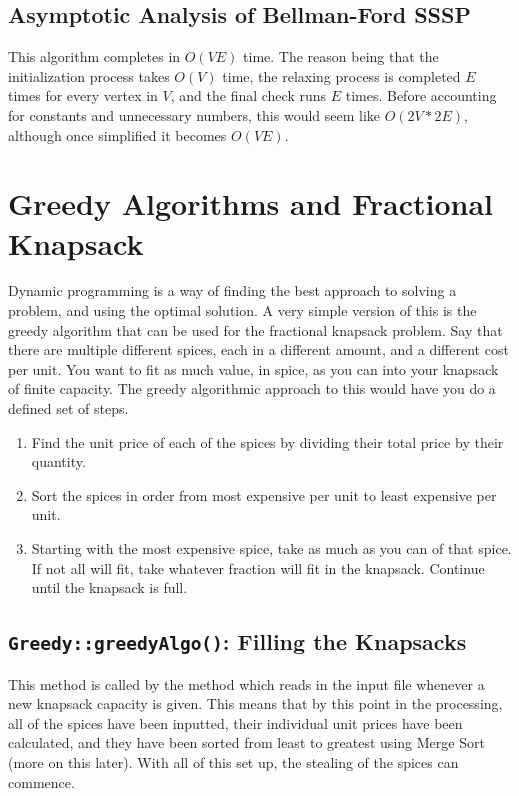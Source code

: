 \documentclass[letterpaper, 10pt]{article}
\begin{document}
\subsection{Asymptotic Analysis of Bellman-Ford SSSP}

This algorithm completes in $O(VE)$ time. The reason being that the initialization process takes $O(V)$ time,  the relaxing process is completed $E$ times for every  vertex in $V$, and the final check runs $E$ times. Before accounting for constants and unnecessary numbers, this would seem like $O(2V*2E)$, although once simplified it becomes $O(VE)$.

\section{Greedy Algorithms and Fractional Knapsack}

Dynamic programming is a way of finding the best approach to solving a problem, and using the optimal solution. A very simple version of this is the greedy algorithm that can be used for the fractional knapsack problem. Say that there are multiple different spices, each in a different amount, and a different cost per unit. You want to fit as much value, in spice, as you can into your knapsack of finite capacity. The greedy algorithmic approach to this would have you do a defined set of steps.

\begin{enumerate}
    \item Find the unit price of each of the spices by dividing their total price by their quantity.
    \item Sort the spices in order from most expensive per unit to least expensive per unit.
    \item Starting with the most expensive spice, take as much as you can of that spice. If not all will fit, take whatever fraction will fit in the knapsack. Continue until the knapsack is full.
\end{enumerate}

\subsection{\texttt{Greedy::greedyAlgo()}: Filling the Knapsacks}

This method is called by the method which reads in the input file whenever a new knapsack capacity is given. This means that by this point in the processing, all of the spices have been inputted, their individual unit prices have been calculated, and they have been sorted from least to greatest using Merge Sort (more on this later). With all of this set up, the stealing of the spices can commence.
\end{document}
